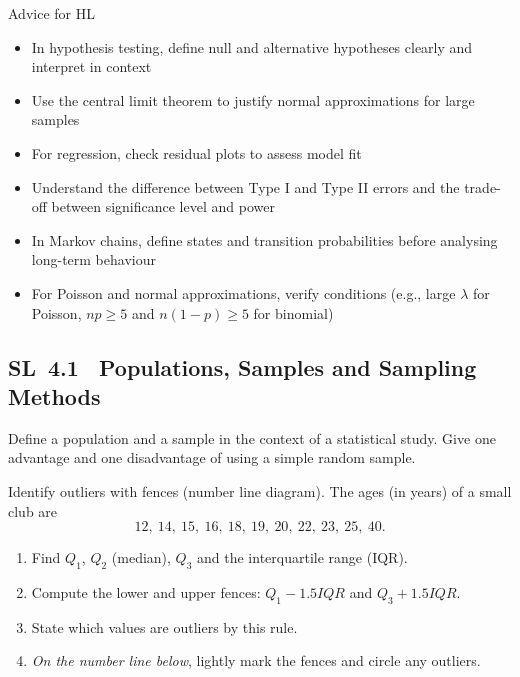 \documentclass[11pt]{article}
\def\textbf#1{#1}%
\def\mathrm#1{#1}%
\newcommand{\tocsubsection}[1]{\subsection{#1}}
\newcounter{question}
\begin{document}
\textbf{Advice for HL}  
\begin{itemize}
  \item In hypothesis testing, define null and alternative hypotheses clearly and interpret in context
  \item Use the central limit theorem to justify normal approximations for large samples
  \item For regression, check residual plots to assess model fit
  \item Understand the difference between Type I and Type II errors and the trade-off between significance level and power
  \item In Markov chains, define states and transition probabilities before analysing long-term behaviour
  \item For Poisson and normal approximations, verify conditions (e.g., large $\lambda$ for Poisson, $np \geq 5$ and $n(1-p) \geq 5$ for binomial)
\end{itemize}


\tocsubsection{SL 4.1 \; Populations, Samples and Sampling Methods}

\begin{question}
Define a population and a sample in the context of a statistical study.  Give
one advantage and one disadvantage of using a simple random sample.
\end{question}



\begin{question}
\textbf{Identify outliers with fences (number line diagram).}
The ages (in years) of a small club are
\[
12,\ 14,\ 15,\ 16,\ 18,\ 19,\ 20,\ 22,\ 23,\ 25,\ 40.
\]
\begin{enumerate}
  \item Find $Q_1$, $Q_2$ (median), $Q_3$ and the interquartile range (IQR).
  \item Compute the lower and upper fences: $Q_1-1.5\mathrm{IQR}$ and $Q_3+1.5\mathrm{IQR}$.
  \item State which values are outliers by this rule.
  \item \emph{On the number line below}, lightly mark the fences and circle any outliers.
\end{enumerate}

\begin{center}
\end{center}
\end{question}
\end{document}
